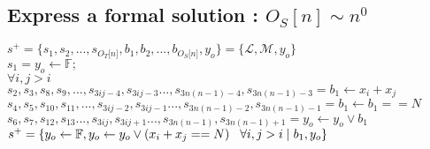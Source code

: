 \documentclass[11pt]{article}
\begin{document}
\subsection{Express a formal solution : $O_S[n] \sim n^0$}
\begin{center}
\vspace{1.5mm}
$
s^+ = \{ s_1,s_2,...,s_{O_T \lbrack n \rbrack }, b_1, b_2,...,b_{O_S \lbrack n \rbrack},y_o \} = \{ \mathcal{L},\mathcal{M},y_o\}
$
\\ \vspace{2mm}
$
s_1 = y_o \leftarrow \mathbb{F};
$
\\ \vspace{2mm}
$
\forall i,j > i
$
\\ \vspace{2mm}
$
s_2,s_3,s_8,s_9,...,s_{3ij-4},s_{3ij-3}...,s_{3n(n-1)-4},s_{3n(n-1)-3} =  b_1 \leftarrow x_i + x_j 
$
\\ \vspace{2mm}
$
s_4,s_5,s_{10},s_{11},...,s_{3ij-2},s_{3ij-1}...,s_{3n(n-1)-2},s_{3n(n-1)-1} = b_1 \leftarrow b_1 == N
$
\\ \vspace{2mm}
$
s_6,s_7,s_{12},s_{13}...,s_{3ij},s_{3ij+1}...,s_{3n(n-1)},s_{3n(n-1)+1} = y_o \leftarrow y_o \lor b_1
$
\\ \vspace{2mm}
$
s^+ = \{y_o \leftarrow \mathbb{F},y_o \leftarrow y_o \lor (x_i + x_j == N) \hspace{3mm} \forall i,j > i \hspace{1mm}| \hspace{1mm} b_1,y_o\}
$
\end{center}
\end{document}
